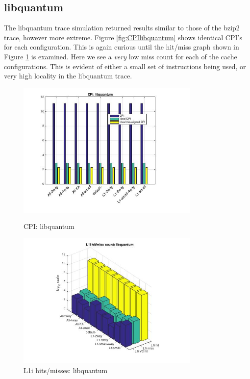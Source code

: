 \documentclass[11pt,titlepage]{article}
\begin{document}
    \subsection{libquantum}
    The libquantum trace simulation returned results similar to those of the bzip2 trace, however more extreme. Figure \ref{fig:CPIlibquantum} shows identical CPI's for each configuration. This is again curious until the hit/miss graph shown in Figure \ref{fig:L1IHM_libquantum} is examined. Here we see  a \emph{very} low miss count for each of the cache configurations. This is evident of either a small set of instructions being used, or very high locality in the libquantum trace.
        \begin{figure}[H]
          \centering
          \begin{minipage}{.45\textwidth}
             \includegraphics[width=9cm]{CPIlibquantum}
             \caption{CPI: libquantum}
             \label{fig:CPIlibquantum}
          \end{minipage}
          \begin{minipage}{.45\textwidth}
              \includegraphics[width=9cm]{L1IHM_libquantum}
              \caption{L1i hits/misses: libquantum}
              \label{fig:L1IHM_libquantum}
          \end{minipage}%
          \end{figure}
\end{document}
